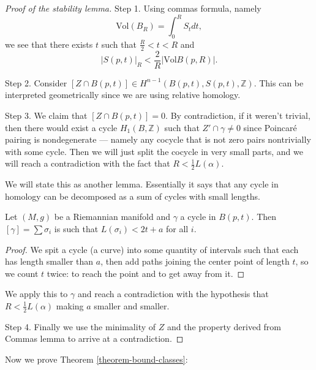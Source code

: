 \begin{proof}[Proof of the stability lemma]
\medskip\noindent
Step 1. Using commas formula, namely
$$
\text{Vol}(B_R)=\int_0^R S_tdt,
$$
we see that there exists $t$ such that
$\frac{R}{2}<t<R$ and
$$
|S(p,t)|_R< \frac{2}{R}|\text{Vol}B(p,R)|.
$$

\medskip\noindent
Step 2. Consider
$[Z \cap B(p,t)] \in
H^{n-1}(B(p,t),S(p,t),\mathbb{Z})$.
This can be interpreted geometrically since
we are using relative homology.

\medskip\noindent
Step 3. We claim that $[Z \cap B(p,t)]=0$.
By contradiction,
if it weren't trivial, then there would exist
a cycle $H_1(B,\mathbb{Z})$
such that $Z' \cap \gamma \neq 0$ since
Poincaré pairing is nondegenerate ---
namely any cocycle that is not zero pairs
nontrivially with some cycle.
Then we will just split the cocycle in very
small parts,
and we will reach a contradiction with the
fact that
$R<\frac{1}{2}L(\alpha)$.

We will state this as another lemma.
Essentially it says that any
cycle in homology can be decomposed as a sum
of cycles
with small lengths.

\begin{lemma}
\label{lemma-curve-factoring-gromov}
Let $(M,g)$ be a Riemannian manifold and
$\gamma$ a cycle in $B(p,t)$.
Then $[\gamma]=\sum \sigma_i$ is such that
 $L(\sigma_i)<2t+a$ for all $i$.
\end{lemma}

\begin{proof}
We spit a cycle (a curve) into some quantity
of intervals
such that each has length smaller than $a$,
then add paths joining the center point of
length $t$,
so we count $t$ twice: to reach the point and
to get away from it.
\end{proof}

\noindent
We apply this to $\gamma$ and reach a
contradiction
with the hypothesis that
$R<\frac{1}{2}L(\alpha)$ making $a$ smaller
and
smaller.

\medskip\noindent
Step 4. Finally we use the minimality of $Z$
and the property
derived from Commas lemma to arrive at a
contradiction.
\end{proof}

\noindent
Now we prove Theorem
\ref{theorem-bound-classes}:

